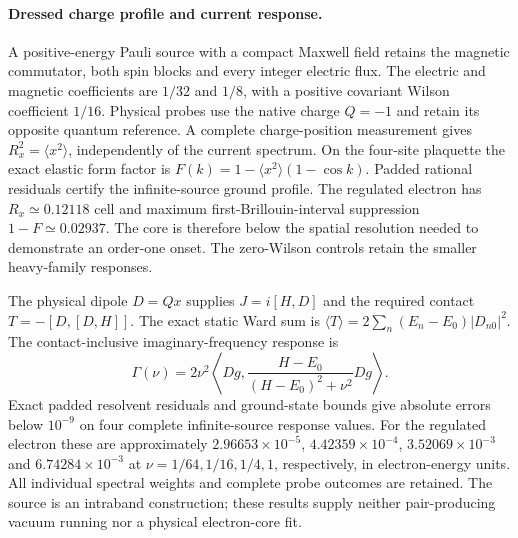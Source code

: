 \paragraph{Dressed charge profile and current response.}
A positive-energy Pauli source with a compact Maxwell field retains the
magnetic commutator, both spin blocks and every integer electric flux.
The electric and magnetic coefficients are $1/32$ and $1/8$, with a positive
covariant Wilson coefficient $1/16$. Physical probes use the native charge
$Q=-1$ and retain its opposite quantum reference. A complete charge-position
measurement gives $R_x^2=\langle x^2\rangle$, independently of the current
spectrum. On the four-site plaquette the exact elastic form factor is
$F(k)=1-\langle x^2\rangle(1-\cos k)$. Padded rational residuals certify the
infinite-source ground profile. The regulated electron has
$R_x\simeq0.12118$ cell and maximum first-Brillouin-interval suppression
$1-F\simeq0.02937$. The core is therefore below the spatial resolution needed
to demonstrate an order-one onset. The zero-Wilson controls retain the
smaller heavy-family responses.

The physical dipole $D=Qx$ supplies $J=i[H,D]$ and the required contact
$T=-[D,[D,H]]$. The exact static Ward sum is
$\langle T\rangle=2\sum_n(E_n-E_0)|D_{n0}|^2$.
The contact-inclusive imaginary-frequency response is
\[
 \Gamma(\nu)=2\nu^2\left\langle Dg,
 \frac{H-E_0}{(H-E_0)^2+\nu^2}Dg\right\rangle.
\]
Exact padded resolvent residuals and ground-state bounds give absolute
errors below $10^{-9}$ on four complete infinite-source response values.
For the regulated electron these are approximately
$2.96653\times10^{-5}$, $4.42359\times10^{-4}$,
$3.52069\times10^{-3}$ and $6.74284\times10^{-3}$ at
$\nu=1/64,1/16,1/4,1$, respectively, in electron-energy units.
All individual spectral weights and complete probe outcomes are retained.
The source is an intraband construction; these results supply neither
pair-producing vacuum running nor a physical electron-core fit.

